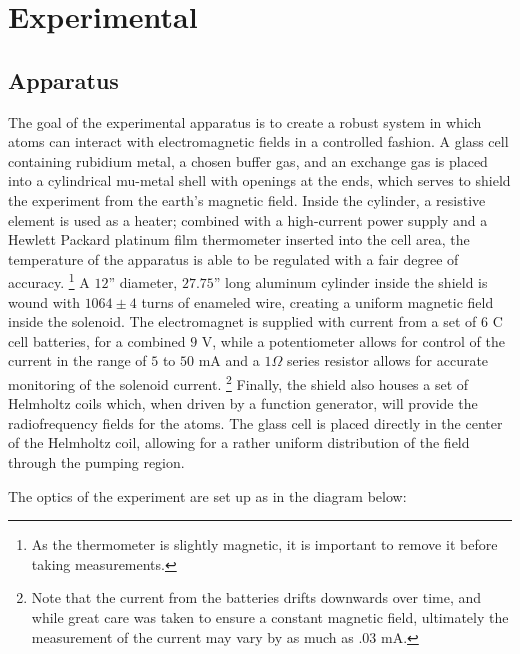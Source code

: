 
\section{Experimental}\label{experimental}

\subsection{Apparatus}\label{apparatus}

The goal of the experimental apparatus is to create a robust system in which atoms can interact with electromagnetic fields in a controlled fashion. A glass cell containing rubidium metal, a chosen buffer gas, and an exchange gas is placed into a cylindrical mu-metal shell with openings at the ends, which serves to shield the experiment from the earth's magnetic field. Inside the cylinder, a resistive element is used as a heater; combined with a high-current power supply and a Hewlett Packard platinum film thermometer inserted into the cell area, the temperature of the apparatus is able to be regulated with a fair degree of accuracy. \footnote{As the thermometer is slightly magnetic, it is important to remove it before taking measurements.} A $12$'' diameter, $27.75$'' long aluminum cylinder inside the shield is wound with $1064\pm4$ turns of enameled wire, creating a uniform magnetic field inside the solenoid. The electromagnet is supplied with current from a set of $6$ C cell batteries, for a combined $9$ V, while a potentiometer allows for control of the current in the range of $5$ to $50$ mA and a $1 \Omega$ series resistor allows for accurate monitoring of the solenoid current. \footnote{Note that the current from the batteries drifts downwards over time, and while great care was taken to ensure a constant magnetic field, ultimately the measurement of the current may vary by as much as $.03$ mA.} Finally, the shield also houses a set of Helmholtz coils which, when driven by a function generator, will provide the radiofrequency fields for the atoms. The glass cell is placed directly in the center of the Helmholtz coil, allowing for a rather uniform distribution of the field through the pumping region.

The optics of the experiment are set up as in the diagram below: 

